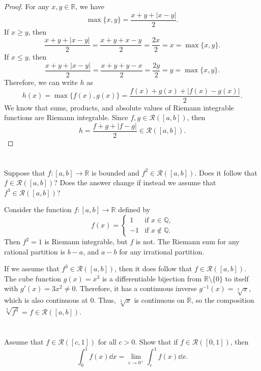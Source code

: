\documentclass[12pt]{article}
\newenvironment{problem}
    {\begin{lrbox}{\mybox}\begin{minipage}{0.98\textwidth}}
    {\end{minipage}\end{lrbox}\begin{center}\framebox[\textwidth]{\usebox{\mybox}}\end{center}}
\theoremstyle{definition}
\newcommand{\Q}{\mathbb{Q}}
\newcommand{\R}{\mathbb{R}}
\begin{document}
\begin{proof}
    For any $x, y \in \R$, we have
    \[
        \max\{x, y\} = \frac{x + y + |x - y|}{2}.
    \]
    If $x \geq y$, then
    \[
        \frac{x + y + |x - y|}{2} = \frac{x + y + x - y}{2} = \frac{2x}{2} = x = \max\{x, y\}.
    \]
    If $x \leq y$, then
    \[
        \frac{x + y + |x - y|}{2} = \frac{x + y + y - x}{2} = \frac{2y}{2} = y = \max\{x, y\}.
    \]
    Therefore, we can write $h$ as
    \[
        h(x) = \max\{f(x), g(x)\} = \frac{f(x) + g(x) + |f(x) - g(x)|}{2}.
    \]
    We know that sums, products, and absolute values of Riemann integrable functions are Riemann integrable. Since $f, g \in \mathcal{R}([a,b])$, then
    \[
        h = \frac{f + g + |f - g|}{2} \in \mathcal{R}([a,b]).
    \]
    
    
\end{proof}

\newpage
\section{}
\begin{problem}
    Suppose that $f:[a,b]\to \R$ is bounded and $f^2\in \mathcal{R}([a,b])$. Does it follow that $f\in \mathcal{R}([a,b])$? Does the answer change if instead we assume that $f^3\in \mathcal{R}([a,b])$?
\end{problem}

Consider the function $f : [a, b] \to \R$ defined by
\[
    f(x) = \begin{cases}
        1 &\text{if $x \in \Q$,} \\
        -1 &\text{if $x \notin \Q$.}
    \end{cases}
\]
Then $f^2 = 1$ is Riemann integrable, but $f$ is not. The Riemann sum for any rational partition is $b - a$, and $a - b$ for any irrational partition.

If we assume that $f^3 \in \mathcal{R}([a,b])$, then it does follow that $f\in \mathcal{R}([a,b])$. The cube function $g(x) = x^3$ is a differentiable bijection from $\R\setminus\{0\}$ to itself with $g'(x) = 3x^2 \ne 0$. Therefore, it has a continuous inverse $g^{-1}(x) = \sqrt[3]{x}$, which is also continuous at $0$. Thus, $\sqrt[3]{x}$ is continuous on $\R$, so the composition $\sqrt[3]{f^3} = f \in \mathcal{R}([a,b])$.

\section{}
\begin{problem}
     Assume that $f\in \mathcal{R}([c,1])$ for all $c>0$. Show that if $f\in \mathcal{R}([0,1])$, then 
    \begin{equation}
        \int_0^1f(x)  \dd{x} = \lim_{c\to 0^+} \int_c^1f(x)  \dd{x}.
    \end{equation}
\end{problem}
\end{document}
